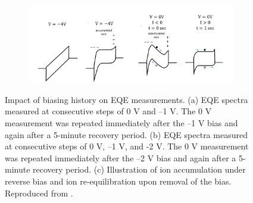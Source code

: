\begin{figure}[ht!]
    
    \begin{subfigure}[t]{0.9\textwidth}
        \centering
        \includegraphics[width=\textwidth]{chapters/material_properties/images/ions.png} %
        \caption{}
        \label{fig:ch2:eqe_drop_mechanism}
    \end{subfigure}

    \caption[Impact of biasing history on EQE measurements.]{Impact of biasing history on EQE measurements. (a) EQE spectra measured at consecutive steps of 0 V and –1 V. The 0 V measurement was repeated immediately after the –1 V bias and again after a 5-minute recovery period. (b) EQE spectra measured at consecutive steps of 0 V, –1 V, and -2 V. The 0 V measurement was repeated immediately after the –2 V bias and again after a 5-minute recovery period. (c) Illustration of ion accumulation under reverse bias and ion re-equilibration upon removal of the bias. Reproduced from \cite{Bowring2018ReverseCells}.}
    \label{fig:ch2:eqe}
\end{figure}

